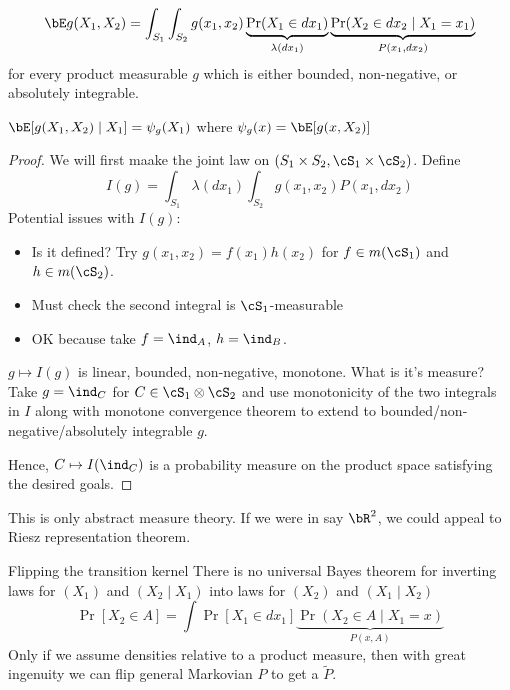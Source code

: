 \begin{theorem}[Fubini]
  \label{thm:fubini}
  \[
    \bE g(X_1, X_2) = \int_{S_1} \int_{S_2} g(x_1, x_2)
    \underbrace{\Pr(X_1 \in dx_1)}_{\lambda(dx_1)}
    \underbrace{\Pr(X_2 \in dx_2 \mid X_1 = x_1)}_{P(x_1, dx_2)}
  \]
  for every product measurable $g$ which is either bounded, non-negative, or
  absolutely integrable.
\end{theorem}

\begin{remark}
  $\bE[g(X_1, X_2) \mid X_1] = \psi_g(X_1)$
  where $\psi_g(x) = \bE[g(x,X_2)]$
\end{remark}

\begin{proof}[Proof]
  We will first maake the joint law on $(S_1 \times S_2, \cS_1 \times \cS_2)$.
  Define
  \[
    I(g) = \int_{S_1} \lambda(dx_1) \int_{S_2} g(x_1, x_2) P(x_1, dx_2)
  \]
  Potential issues with $I(g)$:
  \begin{itemize}
    \item Is it defined? Try $g(x_1, x_2) = f(x_1) h(x_2)$
      for $f \in m(\cS_1)$ and $h \in m(\cS_2)$.
    \item Must check the second integral is $\cS_1$-measurable
    \item OK because take $f = \ind_A$, $h = \ind_B$.
  \end{itemize}

  $g \mapsto I(g)$ is linear, bounded, non-negative, monotone.
  What is it's measure? Take $g = \ind_C$ for $C \in \cS_1 \otimes \cS_2$
  and use monotonicity of the two integrals in $I$ along with monotone
  convergence theorem to extend to bounded/non-negative/absolutely integrable
  $g$.

  Hence, $C \mapsto I(\ind_C)$ is a probability measure on
  the product space satisfying the desired goals.
\end{proof}

\begin{remark}
  This is only abstract measure theory.
  If we were in say $\bR^2$, we could appeal to Riesz representation theorem.
\end{remark}

\begin{note}{Flipping the transition kernel}
  There is no universal Bayes theorem for inverting laws for $(X_1)$
  and $(X_2 \mid X_1)$ into laws for $(X_2)$ and $(X_1 \mid X_2)$
  \[
    \Pr[X_2 \in A] = \int \Pr[X_1 \in dx_1] \underbrace{\Pr(X_2 \in A \mid X_1 = x)}_{P(x, A)}
  \]
  Only if we assume densities relative to a product measure, then with
  great ingenuity we can flip general Markovian $P$ to
  get a $\tilde{P}$.
\end{note}

